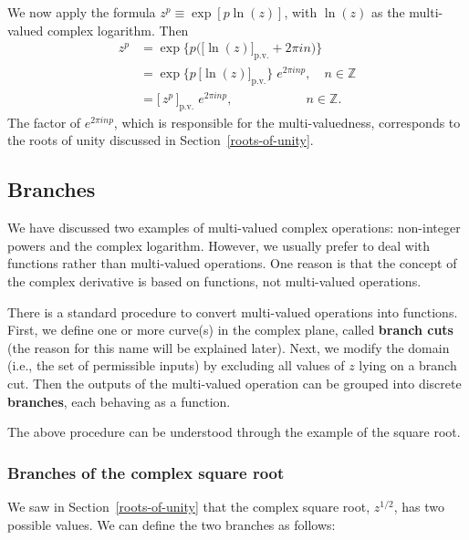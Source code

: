 \documentclass[10pt,a4paper]{article}
\begin{document}
We now apply the formula $z^p \equiv \exp\left[p\ln(z)\right]$, with
$\ln(z)$ as the multi-valued complex logarithm. Then
\begin{align}
  z^p &= \exp\Big\{p\big(\big[\ln(z)\big]_{\mathrm{p.v.}} + 2\pi i n\big)\Big\}\\
  &= \exp\Big\{p\,\big[\ln(z)\big]_{\mathrm{p.v.}}\Big\} \; e^{2\pi i np}, \quad n \in \mathbb{Z}\\
  &= \big[\,z^p\,\big]_{\mathrm{p.v.}} \; e^{2\pi i np}, \quad\qquad\qquad\;\;\, n \in \mathbb{Z}.
\end{align}
The factor of $e^{2\pi i np}$, which is responsible for the
multi-valuedness, corresponds to the roots of unity discussed in
Section~\ref{roots-of-unity}.

\subsection{Branches}\label{branches}

We have discussed two examples of multi-valued complex operations:
non-integer powers and the complex logarithm. However, we usually
prefer to deal with functions rather than multi-valued operations. One
reason is that the concept of the complex derivative is based on
functions, not multi-valued operations.

There is a standard procedure to convert multi-valued operations into
functions. First, we define one or more curve(s) in the complex plane,
called \textbf{branch cuts} (the reason for this name will be
explained later).  Next, we modify the domain (i.e., the set of
permissible inputs) by excluding all values of $z$ lying on a branch
cut. Then the outputs of the multi-valued operation can be grouped
into discrete \textbf{branches}, each behaving as a function.

The above procedure can be understood through the example of the
square root.

\subsubsection{Branches of the complex square root}
\label{branches-of-the-complex-square-root}

We saw in Section~\ref{roots-of-unity} that the complex square root,
$z^{1/2}$, has two possible values. We can define the two branches as
follows:
\end{document}
